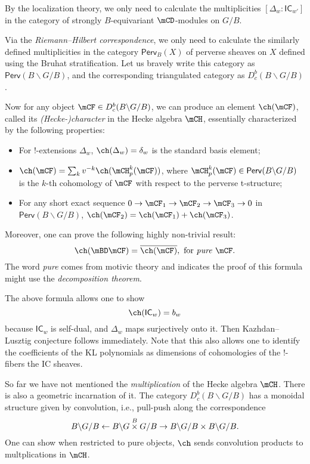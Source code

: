 	By the localization theory, we only need to calculate the multiplicities $[\Delta_w: \mathsf{IC}_{w'}]$ in the category of strongly $B$-equivariant $\mCD$-modules on $G/B$.

	Via the \emph{Riemann--Hilbert correspondence}, we only need to calculate the similarly defined multiplicities in the category $\mathsf{Perv}_B(X)$ of perverse sheaves on $X$ defined using the Bruhat stratification. Let us bravely write this category as $\mathsf{Perv}(B\backslash G/B)$, and the corresponding triangulated category as $D_c^b(B\backslash G/B)$. 

	Now for any object $\mCF\in D_c^b(B\backslash G/B)$, we can produce an element $\ch(\mCF)$, called its \emph{(Hecke-)character} in the Hecke algebra $\mCH$, essentially characterized by the following properties:
	\begin{itemize}
		\item 
			For $!$-extensions $\Delta_w$, $\ch(\Delta_w)=\delta_w$ is the standard basis element;
		\item
			$\ch(\mCF) = \sum_k v^{-k}\ch(\mCH_p^k(\mCF))$, where $\mCH_p^k(\mCF)\in \mathsf{Perv}(B\backslash G/B)$ is the $k$-th cohomology of $\mCF$ with respect to the perverse t-structure;
		\item
			For any short exact sequence $0\to \mCF_1\to \mCF_2\to \mCF_3\to 0$ in $\mathsf{Perv}(B\backslash G/B)$, $\ch(\mCF_2) = \ch(\mCF_1)+ \ch(\mCF_3)$.
	\end{itemize}
	Moreover, one can prove the following highly non-trivial result:
	\[
		\ch(\mBD \mCF) = \overline{ \ch(\mCF) }, \textrm{ for \emph{pure} }\mCF. 
	\]
	The word \emph{pure} comes from motivic theory and indicates the proof of this formula might use the \emph{decomposition theorem}.

	The above formula allows one to show
	\[
		\ch(\mathsf{IC}_w) = b_w
	\]
	because $\mathsf{IC}_w$ is self-dual, and $\Delta_w$ maps surjectively onto it. Then Kazhdan--Lusztig conjecture follows immediately. Note that this also allows one to identify the coefficients of the KL polynomials as dimensions of cohomologies of the $!$-fibers the IC sheaves.

	So far we have not mentioned the \emph{multiplication} of the Hecke algebra $\mCH$. There is also a geometric incarnation of it. The category $D_c^b(B\backslash G/B)$ has a monoidal structure given by convolution, i.e., pull-push along the correspondence
	\[
		B\backslash G/B \gets B\backslash G\mt^B G/B \to B\backslash G/B \mt B\backslash G/B.
	\]
	One can show when restricted to pure objects, $\ch$ sends convolution products to multplications in $\mCH$.


